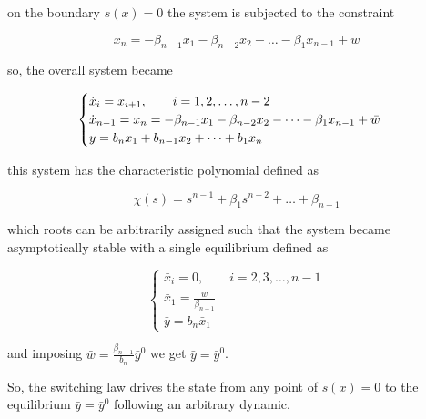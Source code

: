 on the boundary $s(x)=0$ the system is subjected to the constraint

\[
    x_n = - \beta_{n-1} x_1 - \beta_{n-2} x_2 - \dots - \beta_1 x_{n-1} + \bar w
\]

so, the overall system became

\[
    \begin{cases}
        \dot{x}_i = x_{i+1}, \qquad i = 1,2,\dots, n-2 \\
        \dot{x}_{n-1} = x_n = - \beta_{n-1} x_1 - \beta_{n-2} x_2 - \dots - \beta_1 x_{n-1} + \bar w \\
        y = b_n x_1 + b_{n-1} x_2 + \dots + b_1 x_n
    \end{cases}
\]

this system has the characteristic polynomial defined as

\[
    \chi(s) = s^{n-1} + \beta_1 s^{n-2} + \dots + \beta_{n-1}
\]

which roots can be arbitrarily assigned such that the system became asymptotically stable with a single equilibrium defined as

\[
    \begin{cases}
        \bar x_i = 0, \qquad i = 2,3,\dots, n-1 \\
        \bar x_1 = \frac{\bar w}{\beta_{n-1}} \\
        \bar y = b_n \bar x_1
    \end{cases}
\]

and imposing $\bar w = \frac{\beta_{n-1}}{b_n} \bar y^0$ we get $\bar y = \bar y^0$.

So, the switching law drives the state from any point of $s(x)=0$ to the equilibrium $\bar y = \bar y^0$ following an arbitrary dynamic.